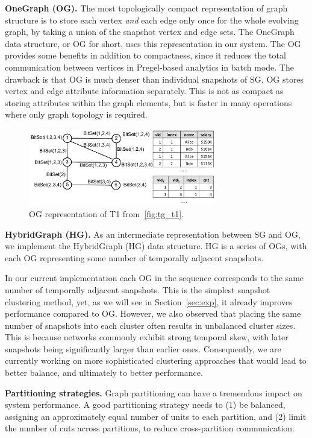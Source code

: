 {\bf OneGraph (OG).}  The most topologically compact representation of
graph structure is to store each vertex {\em and} each edge only once
for the whole evolving graph, by taking a union of the snapshot vertex
and edge sets.  The OneGraph data structure, or OG for short, uses
this representation in our system.
%
The OG provides some benefits in addition to compactness, since it
reduces the total communication between vertices in Pregel-based
analytics in batch mode.    The
drawback is that OG is much denser than individual snapshots of SG.
OG stores vertex and edge attribute information separately.  This is
not as compact as storing attributes within the graph elements, but is
faster in many operations where only graph topology is required.

\begin{figure}[t!]
\includegraphics[width=3.2in]{figs/ogc.pdf}
\caption{OG representation of T1 from~\ref{fig:tg_t1}.}
\label{fig:ogc}
\end{figure}

{\bf HybridGraph (HG).} As an intermediate representation between SG
and OG, we implement the HybridGraph (HG) data structure.  HG is a
series of OGs, with each OG representing some number of temporally
adjacent snapshots.

In our current implementation each OG in the sequence corresponds to
the same number of temporally adjacent snapshots.  This is the
simplest snapshot clustering method, yet, as we will see in
Section~\ref{sec:exp}, it already improves performance
compared to OG.  However, we also observed that placing the same
number of snapshots into each cluster often results in unbalanced
cluster sizes.  This is because networks commonly exhibit strong
temporal skew, with later snapshots being significantly larger than
earlier ones.  Consequently, we are currently working on more
sophisticated clustering approaches that would lead to better balance,
and ultimately to better performance.

{\bf Partitioning strategies.}  Graph partitioning can have a
tremendous impact on system performance.  A good partitioning strategy
needs to (1) be balanced, assigning an approximately equal number of
units to each partition, and (2) limit the number of cuts across
partitions, to reduce cross-partition communication.

